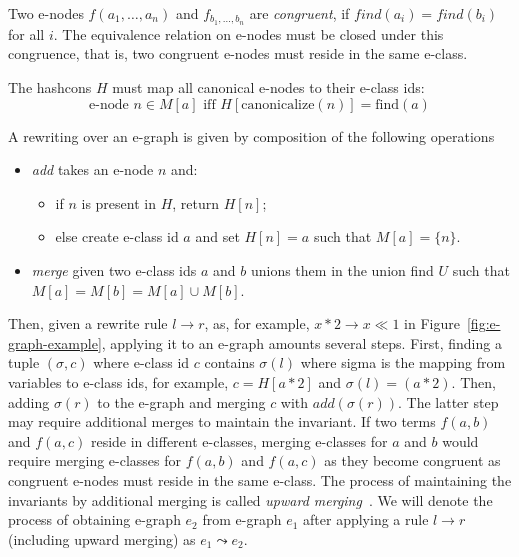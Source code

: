 \begin{definition}
Two e-nodes $f(a_{1}, \ldots, a_{n})$ and $f_{b_{1}, \ldots, b_{n}}$ are \textit{congruent}, if $find(a_{i}) = find(b_{i})$ for all $i$.
The equivalence relation on e-nodes must be closed under this congruence, that is, two congruent e-nodes must reside in the same e-class.
\end{definition}

\begin{definition}
The hashcons $H$ must map all canonical e-nodes to their e-class ids:
\[
\text{e-node } n \in M[a] \text{ iff } H[\text{canonicalize}(n)] = \text{find}(a)
\]
\end{definition}

\begin{definition}
A rewriting over an e-graph is given by composition of the following operations
\begin{itemize}
    \item \textit{add} takes an e-node $n$ and:
    \begin{itemize}
        \item if $n$ is present in $H$, return $H[n]$;
        \item else create e-class id $a$ and set $H[n] = a$ such that $M[a] = \{n\}$.
    \end{itemize}
    \item \textit{merge} given two e-class ids $a$ and $b$ unions them in the union find $U$ such that $M[a] = M[b] = M[a] \cup M[b]$.
\end{itemize}
\end{definition}
Then, given a rewrite rule $l \to r$, as, for example, $x * 2 \to x \ll 1$ in Figure~\ref{fig:e-graph-example}, applying it to an e-graph amounts several steps.
First, finding a tuple $(\sigma, c)$ where e-class id $c$ contains $\sigma(l)$ where sigma is the mapping from variables to e-class ids, for example, $c = H[a * 2]$ and $\sigma(l) = (a * 2)$.
Then, adding $\sigma(r)$ to the e-graph and merging $c$ with $add(\sigma(r))$.
The latter step may require additional merges to maintain the invariant.
If two terms $f(a,b)$ and $f(a,c)$ reside in different e-classes, merging e-classes for $a$ and $b$ would require merging e-classes for $f(a,b)$ and $f(a,c)$ as they become congruent as congruent e-nodes must reside in the same e-class.
The process of maintaining the invariants by additional merging is called \textit{upward merging}~\cite{EggPaper}.
We will denote the process of obtaining e-graph $e_2$ from e-graph $e_1$ after applying a rule $l \to r$ (including upward merging) as $e_1 \leadsto e_2$.


